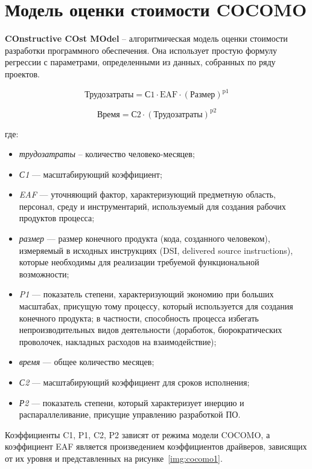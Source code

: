 \section{Модель оценки стоимости COCOMO}

\textbf{COnstructive COst MOdel} -- алгоритмическая модель оценки стоимости разработки программного обеспечения. Она использует простую формулу регрессии с параметрами, определенными из данных, собранных по ряду проектов.

\begin{equation}
    \text{Трудозатраты} = \text{С1} \cdot \text{EAF} \cdot (\text{Размер})^{\text{p1}}
\end{equation}

\begin{equation}
    \text{Время} = \text{С2} \cdot (\text{Трудозатраты})^{\text{p2}}
\end{equation}

\noindent где:

\begin{itemize}
    \item \textit{трудозатраты} -- количество человеко-месяцев;
    \item \textit{С1} — масштабирующий коэффициент;
    \item \textit{EAF} — уточняющий фактор, характеризующий предметную область, персонал, среду и инструментарий, используемый для создания рабочих продуктов процесса;
    \item \textit{размер} — размер конечного продукта (кода, созданного человеком), измеряемый в исходных инструкциях (DSI, delivered source instructions), которые необходимы для реализации требуемой функциональной возможности;
    \item \textit{P1} — показатель степени, характеризующий экономию при больших масштабах, присущую тому процессу, который используется для создания конечного продукта; в частности, способность процесса избегать непроизводительных видов деятельности (доработок, бюрократических проволочек, накладных расходов на взаимодействие);
    \item \textit{время} — общее количество месяцев;
    \item \textit{С2} — масштабирующий коэффициент для сроков исполнения;
    \item \textit{Р2} — показатель степени, который характеризует инерцию и распараллеливание, присущие управлению разработкой ПО.
\end{itemize}

Коэффициенты C1, P1, C2, P2 зависят от режима модели COCOMO, а коэффициент EAF является произведением коэффициентов драйверов, зависящих от их уровня и представленных на рисунке~\ref{img:cocomo1}.

